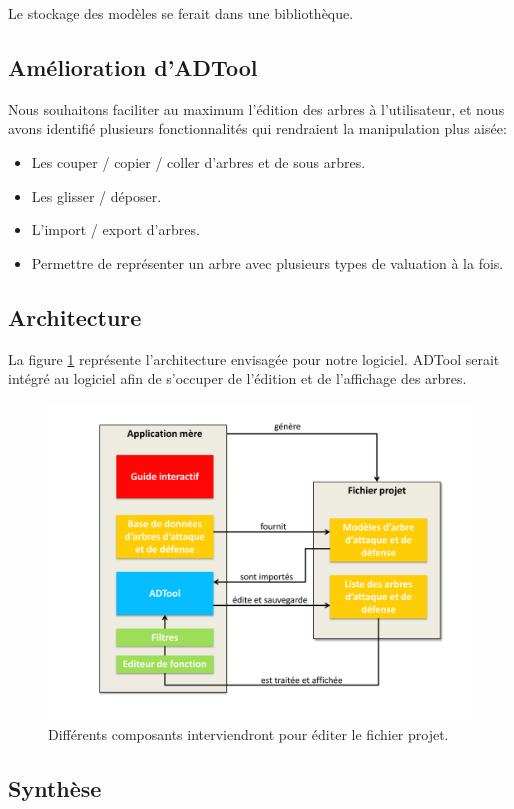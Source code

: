         Le stockage des modèles se ferait dans une bibliothèque.


    \subsection{Amélioration d'ADTool}
        \label{sec:adtoolpp}

        Nous souhaitons faciliter au maximum l'édition des arbres à l'utilisateur, et nous avons identifié plusieurs fonctionnalités qui rendraient la manipulation plus aisée:
        \begin{itemize}
            \item Les couper / copier / coller d'arbres et de sous arbres.
            \item Les glisser / déposer.
            \item L'import / export d'arbres.
            \item Permettre de représenter un arbre avec plusieurs types de valuation à la fois.
        \end{itemize}

    \subsection{Architecture}
        \label{sec:archi}

        La figure \ref{fig:archi} représente l'architecture envisagée pour notre logiciel. ADTool serait intégré au logiciel afin de s'occuper de l'édition et de l'affichage des arbres.

        \begin{figure}
            \begin{center}
                \includegraphics[width=1\textwidth]{figure/archi.pdf}
            \end{center}
            \caption{Différents composants interviendront pour éditer le fichier projet.}
            \label{fig:archi}
        \end{figure}


    \subsection{Synthèse}
        \label{sec:cahier_synthese}